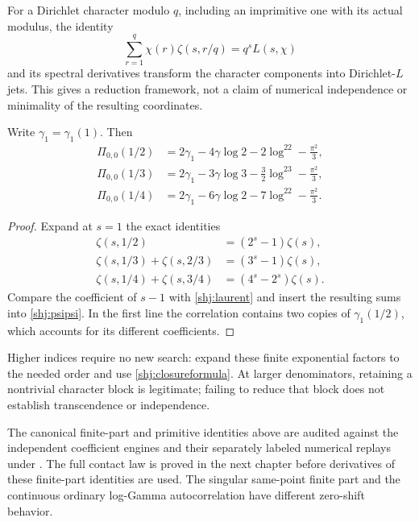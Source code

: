For a Dirichlet character modulo $q$, including an imprimitive one with its actual modulus, the identity
\[
\sum_{r=1}^q\chi(r)\zeta(s,r/q)=q^sL(s,\chi)
\]
and its spectral derivatives transform the character components into Dirichlet-$L$ jets. This gives a reduction framework, not a claim of numerical independence or minimality of the resulting coordinates.

\begin{corollary}\label{shj:rationalpsi}
Write $\gamma_1=\gamma_1(1)$. Then
\begin{align}
\Pi_{0,0}(1/2)&=2\gamma_1-4\gamma\log2-2\log^22-\frac{\pi^2}{3},\label{shj:rathalf}\\
\Pi_{0,0}(1/3)&=2\gamma_1-3\gamma\log3-\frac32\log^23-\frac{\pi^2}{3},\label{shj:ratthird}\\
\Pi_{0,0}(1/4)&=2\gamma_1-6\gamma\log2-7\log^22-\frac{\pi^2}{3}.
\label{shj:ratquarter}
\end{align}
\end{corollary}
\begin{proof}
Expand at $s=1$ the exact identities
\begin{align*}
\zeta(s,1/2)&=(2^s-1)\zeta(s),\\
\zeta(s,1/3)+\zeta(s,2/3)&=(3^s-1)\zeta(s),\\
\zeta(s,1/4)+\zeta(s,3/4)&=(4^s-2^s)\zeta(s).
\end{align*}
Compare the coefficient of $s-1$ with \eqref{shj:laurent} and insert the resulting sums into \eqref{shj:psipsi}. In the first line the correlation contains two copies of $\gamma_1(1/2)$, which accounts for its different coefficients.
\end{proof}
Higher indices require no new search: expand these finite exponential factors to the needed order and use \eqref{shj:closureformula}. At larger denominators, retaining a nontrivial character block is legitimate; failing to reduce that block does not establish transcendence or independence.


The canonical finite-part and primitive identities above are audited
against the independent coefficient engines and their separately labeled
numerical replays under . The full contact
law is proved in the next chapter before derivatives of these finite-part
identities are used. The singular same-point finite part and the continuous
ordinary log-Gamma autocorrelation have different zero-shift behavior.
